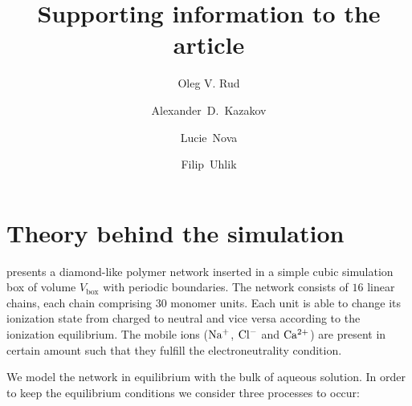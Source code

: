 \documentclass{elsarticle}
\begin{document}
\title{Supporting information to the article\\
\mytitle}



    \author[cuni,imc]{Oleg V. Rud}
    \author[cuni]{Alexander~D.~Kazakov}
    \author[cuni]{Lucie~Nova}
    \author[cuni]{Filip~Uhlik}

\maketitle






\section{Theory behind the simulation\label{sec: theory}}

 presents a diamond-like polymer network inserted in a simple cubic simulation box of volume $V_{\mathrm{box}}$ with periodic boundaries.
The network consists of $16$ linear \PE{} chains, each chain comprising $30$ monomer units.
Each unit is able to change its ionization state from charged to neutral and vice versa according to the ionization equilibrium.
The mobile ions ($\mathrm{Na^+}$, $\mathrm{Cl^-}$ and $\mathrm{Ca^{2+}}$) are present in certain amount such that they fulfill the electroneutrality condition.

We model the network in equilibrium with the bulk of aqueous solution.
In order to keep the equilibrium conditions we consider three processes to occur:
\end{document}
